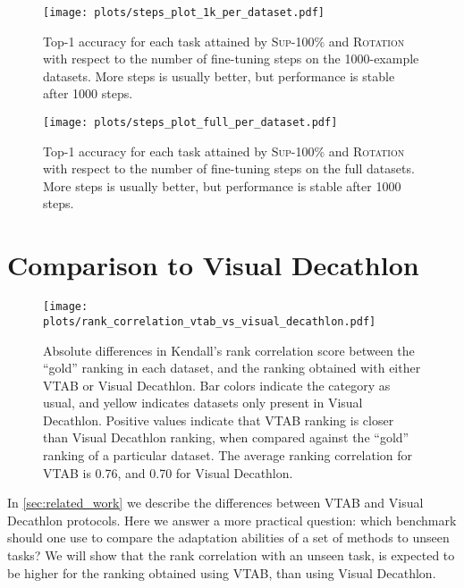 \documentclass{article}
\begin{document}
\begin{figure}[H]
    \centering
    \texttt{[image: plots/steps\_plot\_1k\_per\_dataset.pdf]}
    \caption{
    Top-1 accuracy for each task attained by \textsc{Sup-100\%} and \textsc{Rotation} with respect to the number of fine-tuning steps on the 1000-example datasets.
    More steps is usually better, but performance is stable after 1000 steps.}
    \label{fig:budget-plot-1k}

    \vspace{5mm}

    \centering
    \texttt{[image: plots/steps\_plot\_full\_per\_dataset.pdf]}
    \caption{
    Top-1 accuracy for each task attained by \textsc{Sup-100\%} and \textsc{Rotation} with respect to the number of fine-tuning steps on the full datasets.
    More steps is usually better, but performance is stable after 1000 steps.}
    \label{fig:budget-plot-full}
\end{figure}

\clearpage
\section{Comparison to Visual Decathlon}
\label{sec:visual_decathlon}

\begin{figure}[h]
\centering
\texttt{[image: plots/rank\_correlation\_vtab\_vs\_visual\_decathlon.pdf]}
\caption{Absolute differences in Kendall's rank correlation score between the ``gold'' ranking
  in each dataset, and the ranking obtained with either VTAB or Visual Decathlon.
  Bar colors indicate the category as usual, and yellow indicates datasets only present in Visual Decathlon.
  Positive values indicate that VTAB ranking is closer than Visual Decathlon ranking, when
  compared against the ``gold'' ranking of a particular dataset.
  The average ranking correlation for VTAB is 0.76, and 0.70 for Visual Decathlon.
}
\label{fig:rank_correlation_vtab_vs_visual_decathlon}
\end{figure}

In \cref{sec:related_work} we describe the differences between VTAB
and Visual Decathlon protocols. Here we answer a more practical question: 
which benchmark should one use to compare the adaptation abilities of a set of methods
to unseen tasks? 
We will show that the rank correlation with an unseen task, is expected
to be higher for the ranking obtained using VTAB, than using Visual Decathlon.
\end{document}
